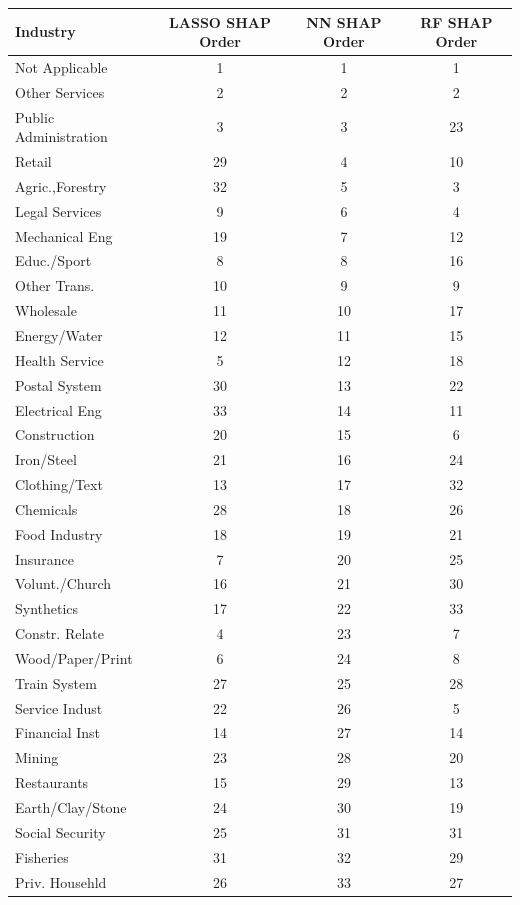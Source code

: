 \begin{tabular}{lccc}
\hline\hline
Industry & LASSO SHAP Order & NN SHAP Order & RF SHAP Order \\
\hline
Not Applicable&1&1&1\\
Other Services&2&2&2\\
Public Administration&3&3&23\\
Retail&29&4&10\\
Agric.,Forestry&32&5&3\\
Legal Services&9&6&4\\
Mechanical Eng&19&7&12\\
Educ./Sport&8&8&16\\
Other Trans.&10&9&9\\
Wholesale&11&10&17\\
Energy/Water&12&11&15\\
Health Service&5&12&18\\
Postal System&30&13&22\\
Electrical Eng&33&14&11\\
Construction&20&15&6\\
Iron/Steel&21&16&24\\
Clothing/Text&13&17&32\\
Chemicals&28&18&26\\
Food Industry&18&19&21\\
Insurance&7&20&25\\
Volunt./Church&16&21&30\\
Synthetics&17&22&33\\
Constr. Relate&4&23&7\\
Wood/Paper/Print&6&24&8\\
Train System&27&25&28\\
Service Indust&22&26&5\\
Financial Inst&14&27&14\\
Mining&23&28&20\\
Restaurants&15&29&13\\
Earth/Clay/Stone&24&30&19\\
Social Security&25&31&31\\
Fisheries&31&32&29\\
Priv. Househld&26&33&27\\
\hline\hline
\end{tabular}
